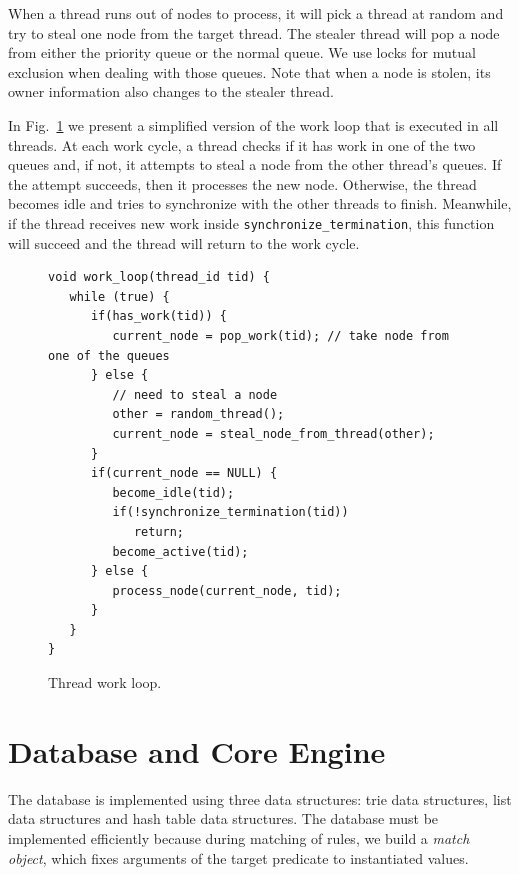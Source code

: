 When a thread runs out of nodes to process, it will pick a thread at random and try to steal one node
from the target thread. The stealer thread will pop a node from either the priority queue or the normal queue. We use locks for mutual exclusion when dealing with those queues. Note that when a
node is stolen, its owner information also changes to the stealer thread.

In Fig.~\ref{code:work_loop} we present a simplified version of the work loop that is executed in all threads. At each work cycle,
a thread checks if it has work in one of the two queues and, if not, it attempts to steal a node from the other thread's queues.
If the attempt succeeds, then it processes the new node. Otherwise, the thread becomes idle and tries to
synchronize with the other threads to finish. Meanwhile, if the thread receives new work inside
\texttt{synchronize\_termination}, this function will succeed and the thread will return to the work cycle.

\begin{figure}[h!]
\small\begin{Verbatim}
void work_loop(thread_id tid) {
   while (true) {
      if(has_work(tid)) {
         current_node = pop_work(tid); // take node from one of the queues
      } else {
         // need to steal a node
         other = random_thread();
         current_node = steal_node_from_thread(other);
      }
      if(current_node == NULL) {
         become_idle(tid);
         if(!synchronize_termination(tid))
            return;
         become_active(tid);
      } else {
         process_node(current_node, tid);
      }
   }
}
\end{Verbatim}
  \caption{Thread work loop.}
  \label{code:work_loop}
\end{figure}

\section{Database and Core Engine}\label{sec:core_engine}

The database is implemented using three data structures: trie data structures, list data structures and hash table data structures.
The database must be implemented efficiently because during matching of rules, we build a
\emph{match object}, which fixes arguments of the target predicate to instantiated values.

